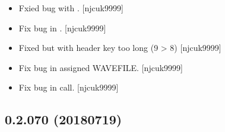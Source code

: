 \documentclass[a4paper,10pt,english]{report}
\begin{document}
\begin{itemize}
\item {} 
Fxied bug with . {[}njcuk9999{]}

\item {} 
Fix bug in . {[}njcuk9999{]}

\item {} 
Fixed but with header key too long (9 \textgreater{} 8) {[}njcuk9999{]}

\item {} 
Fix bug in assigned WAVEFILE. {[}njcuk9999{]}

\item {} 
Fix bug in  call. {[}njcuk9999{]}

\end{itemize}


\subsection{0.2.070 (2018\sphinxhyphen{}07\sphinxhyphen{}19)}
\end{document}
